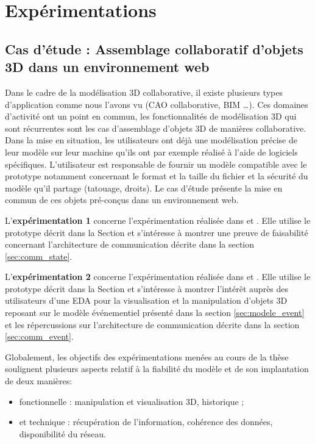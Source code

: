 \chapter{Expérimentations}
\chaptertable

\section{Cas d'étude : Assemblage collaboratif d'objets 3D dans un 
environnement web}

Dans le cadre de la modélisation 3D collaborative, il existe plusieurs types 
d'application comme nous l'avons vu (\gls{CAO} collaborative, \gls{BIM} \dots). 
Ces domaines d'activité ont un point en commun, les fonctionnalités de 
modélisation 3D qui sont récurrentes sont les cas d'assemblage d'objets 3D de 
manières collaborative. Dans la mise en situation, les utilisateurs ont déjà une 
modélisation précise de leur modèle sur leur machine qu'ils ont par exemple 
réalisé à l'aide de logiciels spécifiques. L'utilisateur est responsable de fournir un 
modèle compatible avec le prototype notamment concernant le format et la taille 
du fichier et la sécurité du modèle qu'il partage (tatouage, droits). Le cas d'étude 
présente la mise en commun de ces objets pré-conçus dans un environnement 
web.

L'\textbf{expérimentation 1} concerne l'expérimentation réalisée dans 
\cite{Desprat2015a} 
et \cite{Desprat2015b}. Elle utilise le prototype décrit dans la Section  et s'intéresse à montrer une preuve de faisabilité concernant l'architecture 
de communication décrite dans la section \ref{sec:comm_state}. 

 
L'\textbf{expérimentation 2} concerne l'expérimentation réalisée dans 
\cite{Desprat2016} et 
\cite{Desprat2017}. Elle utilise le prototype décrit dans la Section  
et s'intéresse à montrer l'intérêt auprès des utilisateurs d'une \gls{EDA} pour la 
visualisation et la manipulation d'objets 3D reposant sur le modèle 
événementiel présenté dans la section \ref{sec:modele_event} et les 
répercussions sur l'architecture de 
communication décrite dans la section \ref{sec:comm_event}.


Globalement, les objectifs des expérimentations menées au cours de la thèse 
soulignent 
plusieurs aspects relatif à la fiabilité 
du modèle et de 
son implantation de deux manières: 
\begin{itemize}
	\item fonctionnelle : manipulation et visualisation 
	3D, historique ;
	\item et technique : récupération de l'information, cohérence des 
	données, disponibilité du réseau.
\end{itemize}

